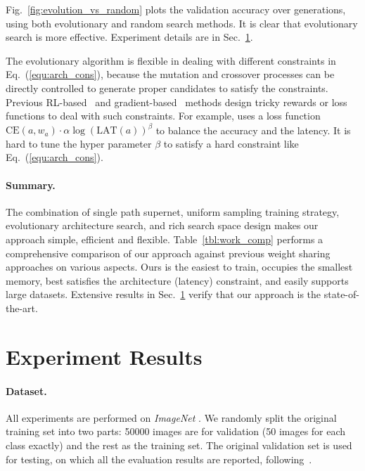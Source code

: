 Fig.~\ref{fig:evolution_vs_random} plots the validation accuracy over generations, using both evolutionary and random search methods. It is clear that evolutionary search is more effective. Experiment details are in Sec.~\ref{sec:results}.

The evolutionary algorithm is flexible in dealing with different constraints in Eq.~(\ref{equ:arch_cons}), because the mutation and crossover processes can be directly controlled to generate proper candidates to satisfy the constraints. Previous RL-based~\cite{tan2018mnasnet} and gradient-based~\cite{cai2018proxylessnas,wu2018fbnet,veniat2018learning} methods design tricky rewards or loss functions to deal with such constraints. For example, \cite{wu2018fbnet} uses a loss function $\mathrm{CE}(a, w_a) \cdot \alpha \log (\mathrm{LAT}(a))^\beta$ to balance the accuracy and the latency. It is hard to tune the hyper parameter $\beta$ to satisfy a hard constraint like Eq.~(\ref{equ:arch_cons}).

\paragraph{Summary. }The combination of single path supernet, uniform sampling training strategy, evolutionary architecture search, and rich search space design makes our approach simple, efficient and flexible. Table~\ref{tbl:work_comp} performs a comprehensive comparison of our approach against previous weight sharing approaches on various aspects. Ours is the easiest to train, occupies the smallest memory, best satisfies the architecture (latency) constraint, and easily supports large datasets. Extensive results in Sec.~\ref{sec:results} verify that our approach is the state-of-the-art.

\section{Experiment Results}
\label{sec:results}

\paragraph{Dataset.} All experiments are performed on \emph{ImageNet} \cite{russakovsky2015imagenet}. We randomly split the original training set into two parts: 50000 images are for validation (50 images for each class exactly) and the rest as the training set. The original validation set is used for testing, on which all the evaluation results are reported, following~\cite{cai2018proxylessnas}.

